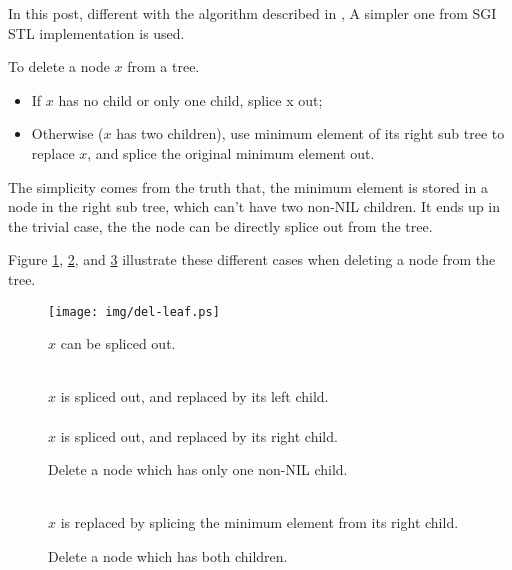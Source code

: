 \documentclass{article}
\begin{document}
In this post, different with the algorithm described in \cite{CLRS},
A simpler one from SGI STL implementation is used.\cite{sgi-stl}

To delete a node $x$ from a tree.
\begin{itemize}
\item If $x$ has no child or only one child, splice x out;
\item Otherwise ($x$ has two children), use minimum element of its right sub tree to replace $x$, and splice the original minimum element out.
\end{itemize}

The simplicity comes from the truth that, the minimum element is stored
in a node in the right sub tree, which can't have two non-NIL children.
It ends up in the trivial case, the the node can be directly splice
out from the tree.

Figure \ref{fig:del-leaf}, \ref{fig:del-1child}, and \ref{fig:del-branch}
illustrate these different cases when deleting a node from the tree.

\begin{figure}[htbp]
       \begin{center}
	\texttt{[image: img/del-leaf.ps]}
        \caption{$x$ can be spliced out.} \label{fig:del-leaf}
       \end{center}
\end{figure}

\begin{figure}[htbp]
        \centering
         \\
        $x$ is spliced out, and replaced by its left child. \\
         \\
        $x$ is spliced out, and replaced by its right child.
        \caption{Delete a node which has only one non-NIL child.}
        \label{fig:del-1child}
\end{figure}

\begin{figure}[htbp]
        \centering
         \\
        $x$ is replaced by splicing the minimum element from its right child.
        \caption{Delete a node which has both children.}
        \label{fig:del-branch}
\end{figure}
\end{document}
